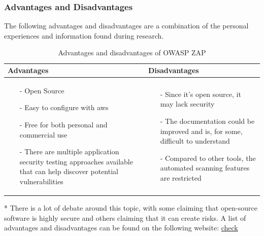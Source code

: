 \subsubsection{Advantages and Disadvantages}
The following advantages and disadvantages are a combination of the personal experiences and information found during research.\cite{prosconsZAP}
\begin{table}[H]
    \begin{threeparttable}
        \begin{tabular}{|>{\raggedright\arraybackslash}p{6cm}|>{\raggedright\arraybackslash}p{6cm}|}
            \hline
            \textbf{Advantages} & \textbf{Disadvantages} \\
            \hline
            \begin{itemize}
                \item [-]Open Source
                \item [-]Easy to configure with \acrshort{aws}
                \item [-] Free for both personal and commercial use
                \item [-]There are multiple application security testing approaches available that can help discover potential vulnerabilities
            \end{itemize}
            &
            \begin{itemize}
                \item [-] Since it's open source, it may lack security\tnote{*}
                \item [-] The documentation could be improved and is, for some, difficult to understand
                \item [-]Compared to other tools, the automated scanning features are restricted
            \end{itemize}
            \\
            \hline
        \end{tabular}
        \begin{tablenotes}
            \item[*] There is a lot of debate around this topic,  with some claiming that open-source software is highly secure and others claiming that it can create risks. A list of advantages and disadvantages can be found on the following website: 
            \href{https://cybersecuritynews.com/pros-and-cons-of-using-open-source-software/}{check}
            \caption{Advantages and disadvantages of OWASP ZAP}
        \end{tablenotes}
    \end{threeparttable}
\end{table}


